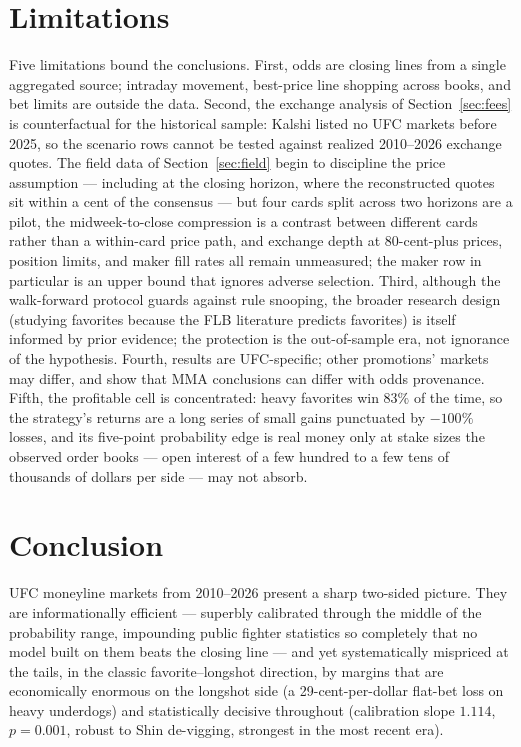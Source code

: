 \documentclass[11pt]{article}
\begin{document}
\section{Limitations}

Five limitations bound the conclusions. First, odds are closing lines from a single aggregated
source; intraday movement, best-price line shopping across books, and bet limits are outside the
data. Second, the exchange analysis of Section~\ref{sec:fees} is counterfactual for the
historical sample: Kalshi listed no UFC markets before 2025, so the scenario rows cannot be
tested against realized 2010--2026 exchange quotes. The field data of Section~\ref{sec:field}
begin to discipline the price assumption --- including at the closing horizon, where the
reconstructed quotes sit within a cent of the consensus --- but four cards split across two
horizons are a pilot, the midweek-to-close compression is a contrast between different cards
rather than a within-card price path, and exchange depth at 80-cent-plus prices, position limits,
and maker fill rates all remain unmeasured; the maker row in particular is an upper bound that
ignores adverse selection.
Third, although the walk-forward protocol guards against rule snooping, the broader research
design (studying favorites because the FLB literature predicts favorites) is itself informed by
prior evidence; the protection is the out-of-sample era, not ignorance of the hypothesis. Fourth,
results are UFC-specific; other promotions' markets may differ, and \citet{miller2026} show that
MMA conclusions can differ with odds provenance. Fifth, the profitable cell is concentrated:
heavy favorites win $83\%$ of the time, so the strategy's returns are a long series of small
gains punctuated by $-100\%$ losses, and its five-point probability edge is real money only at
stake sizes the observed order books --- open interest of a few hundred to a few tens of
thousands of dollars per side --- may not absorb.

\section{Conclusion}

UFC moneyline markets from 2010--2026 present a sharp two-sided picture. They are informationally
efficient --- superbly calibrated through the middle of the probability range, impounding public
fighter statistics so completely that no model built on them beats the closing line --- and yet
systematically mispriced at the tails, in the classic favorite--longshot direction, by margins
that are economically enormous on the longshot side (a 29-cent-per-dollar flat-bet loss on heavy
underdogs) and statistically decisive throughout (calibration slope $1.114$, $p = 0.001$, robust
to Shin de-vigging, strongest in the most recent era).
\end{document}
